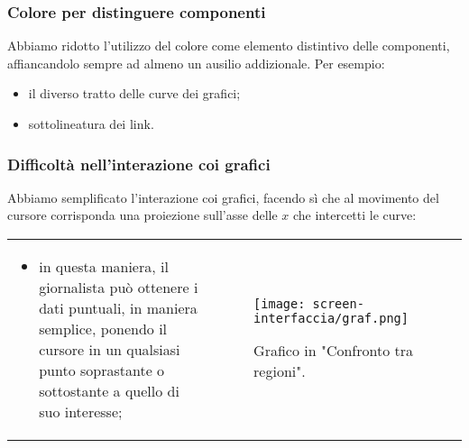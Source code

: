 \begin{frame}
    \frametitle{Colore per distinguere componenti}
    \label{f:colore}
    Abbiamo ridotto l'utilizzo del colore come elemento distintivo delle componenti, affiancandolo sempre ad almeno un ausilio addizionale. Per esempio:
    \begin{itemize}
        \item il diverso tratto delle curve dei grafici;
        \item sottolineatura dei link.
    \end{itemize}
\end{frame}

\begin{frame}
    \frametitle{Difficoltà nell'interazione coi grafici}
    \label{f:difficolta}
    Abbiamo semplificato l'interazione coi grafici, facendo sì che al movimento del cursore corrisponda una proiezione sull'asse delle $x$ che intercetti le curve: 
    \begin{tabular}{p{}p{}}    
        \begin{itemize}
            \item in questa maniera, il giornalista può ottenere i dati puntuali, in maniera semplice, ponendo il cursore in un qualsiasi punto soprastante o sottostante a quello di suo interesse;
        \end{itemize} &
            
        \begin{figure}
            \centering
            \texttt{[image: screen-interfaccia/graf.png]}
            \caption{Grafico in "Confronto tra regioni".} 
        \end{figure}  \\
    \end{tabular}   
\end{frame}